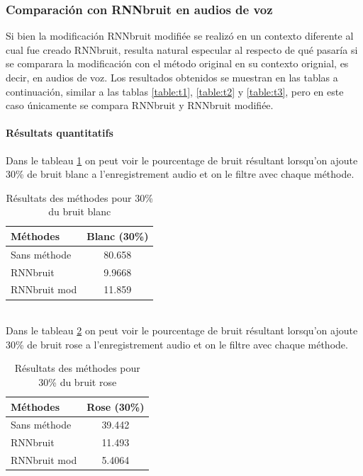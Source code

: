 \documentclass[conference,onecolumn]{IEEEtran}
\begin{document}
\subsubsection{Comparación con RNNbruit en audios de voz}
Si bien la modificación RNNbruit modifiée se realizó en un contexto diferente al cual fue creado RNNbruit, resulta natural especular al respecto de qué pasaría si se comparara la modificación con el método original en su contexto orignial, es decir, en audios de voz. Los resultados obtenidos se muestran en las tablas a continuación, similar a las tablas \ref{table:t1}, \ref{table:t2} y \ref{table:t3}, pero en este caso únicamente se compara RNNbruit y RNNbruit modifiée.

\paragraph{Résultats quantitatifs}
Dans le tableau \ref{table:t13} on peut voir le pourcentage de bruit résultant lorsqu’on ajoute 30\% de bruit blanc a l’enregistrement audio et on le filtre avec chaque méthode.
\begin{table}[hbt!]
    \centering
    \begin{tabular}{ l  c }
    \textbf{Méthodes} & \textbf{Blanc (30\%)} \\
    \hline
    Sans méthode & 80.658 \\
    RNNbruit & 9.9668 \\
    RNNbruit mod & 11.859 \\
    \end{tabular}
    \caption{Résultats des méthodes pour 30\% du bruit blanc}
    \label{table:t13}
\end{table}
\hfill \\
Dans le tableau \ref{table:t14} on peut voir le pourcentage de bruit résultant lorsqu’on ajoute 30\% de bruit rose a l’enregistrement audio et on le filtre avec chaque méthode.
\begin{table}[hbt!]
    \centering
    \begin{tabular}{ l  c }
    \textbf{Méthodes} & \textbf{Rose (30\%)} \\
    \hline
    Sans méthode & 39.442 \\
    RNNbruit & 11.493 \\
    RNNbruit mod & 5.4064 \\
    \end{tabular}
    \caption{Résultats des méthodes pour 30\% du bruit rose}
    \label{table:t14}
\end{table}
\end{document}
